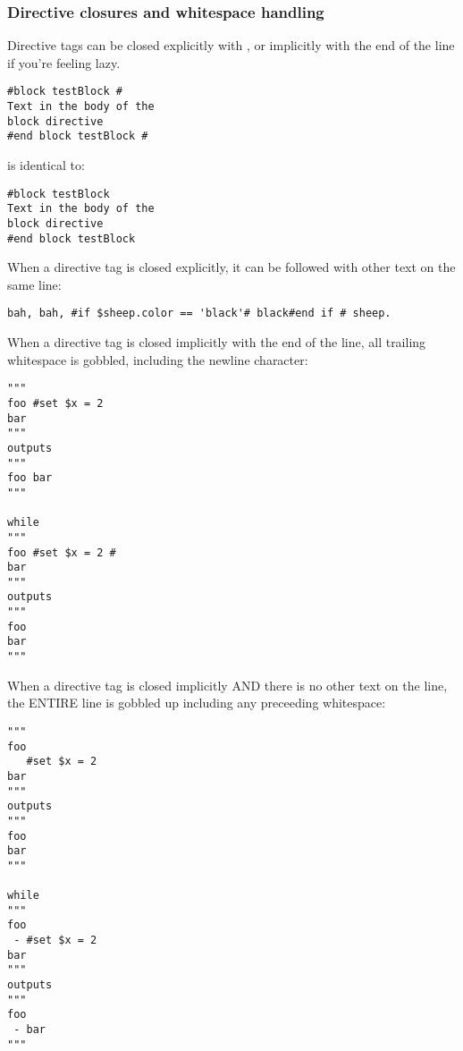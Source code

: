%


\subsubsection{Directive closures and whitespace handling}
\label{language.directives.closures}
Directive tags can be closed explicitly with \code{\#}, or implicitly with the
end of the line if you're feeling lazy.

\begin{verbatim}
#block testBlock #
Text in the body of the
block directive
#end block testBlock #
\end{verbatim}
is identical to:
\begin{verbatim}
#block testBlock
Text in the body of the
block directive
#end block testBlock
\end{verbatim}

When a directive tag is closed explicitly, it can be followed with other text on
the same line:

\begin{verbatim}
bah, bah, #if $sheep.color == 'black'# black#end if # sheep.
\end{verbatim}

When a directive tag is closed implicitly with the end of the line, all trailing
whitespace is gobbled, including the newline character:
\begin{verbatim}
"""
foo #set $x = 2 
bar
"""
outputs 
"""
foo bar
"""

while 
"""
foo #set $x = 2 #
bar
"""
outputs 
"""
foo 
bar
"""
\end{verbatim}

When a directive tag is closed implicitly AND there is no other text on the
line, the ENTIRE line is gobbled up including any preceeding whitespace:
\begin{verbatim}
"""
foo 
   #set $x = 2 
bar
"""
outputs 
"""
foo
bar
"""

while 
"""
foo 
 - #set $x = 2
bar
"""
outputs 
"""
foo 
 - bar
"""
\end{verbatim}

